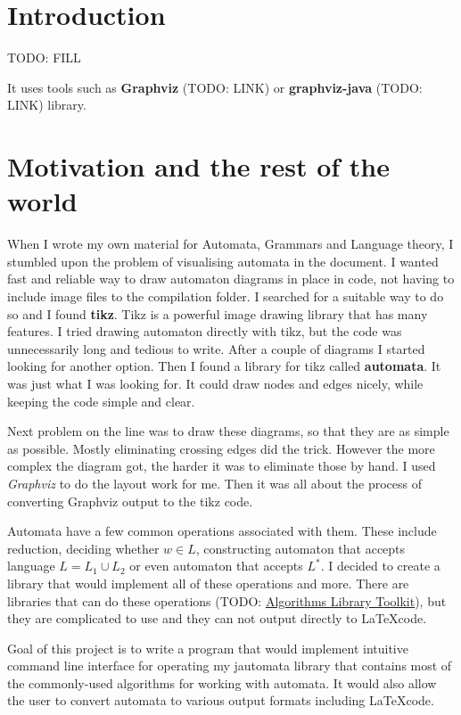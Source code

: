 \documentclass{ctuthesis}
\begin{document}
\maketitle

\chapter{Introduction}
TODO: FILL

It uses tools such as \textbf{Graphviz} (TODO: LINK) or \textbf{graphviz-java} (TODO: LINK) library. 

\chapter{Motivation and the rest of the world}
When I wrote my own material for Automata, Grammars and Language theory, I stumbled upon the problem of visualising automata in the document. I wanted fast and reliable way to draw automaton diagrams in place in code, not having to include image files to the compilation folder. I searched for a suitable way to do so and I found \textbf{tikz}. Tikz is a powerful image drawing library that has many features. I tried drawing automaton directly with tikz, but the code was unnecessarily long and tedious to write. After a couple of diagrams I started looking for another option. Then I found a library for tikz called \textbf{automata}. It was just what I was looking for. It could draw nodes and edges nicely, while keeping the code simple and clear. 

Next problem on the line was to draw these diagrams, so that they are as simple as possible. Mostly eliminating crossing edges did the trick. However the more complex the diagram got, the harder it was to eliminate those by hand. I used \textit{Graphviz} to do the layout work for me. Then it was all about the process of converting Graphviz output to the tikz code.

Automata have a few common operations associated with them. These include reduction, deciding whether $w \in L$, constructing automaton that accepts language $L = L_1 \cup L_2$ or even automaton that accepts $L^*$. I decided to create a library that would implement all of these operations and more. There are libraries that can do these operations (TODO: \href{https://gitlab.fit.cvut.cz/algorithms-library-toolkit/automata-library/}{Algorithms Library Toolkit}), but they are complicated to use and they can not output directly to \LaTeX code. 

Goal of this project is to write a program that would implement intuitive command line interface for operating my jautomata library that contains most of the commonly-used algorithms for working with automata. It would also allow the user to convert automata to various output formats including \LaTeX code.
\end{document}
